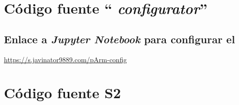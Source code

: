 \chapter{Código fuente ``\pArm{} \textit{configurator}''}
\label{anex:pArm-configurator}


\section{Enlace a \textit{Jupyter Notebook} para configurar el \pArm}
\label{anex:jupyter_binder}
\url{https://s.javinator9889.com/pArm-config}\qquad
{}

\chapter{Código fuente S2}
\label{anex:source_code}
